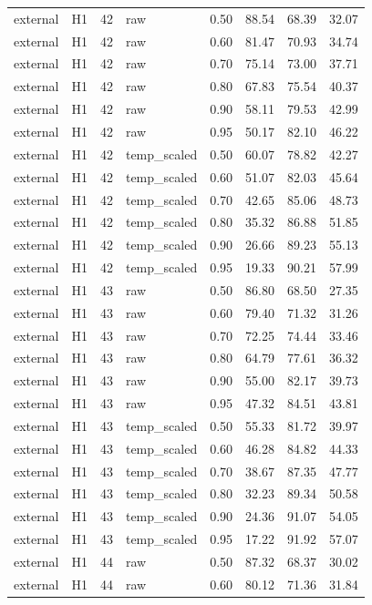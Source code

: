 \begin{tabular}{llrlrrrr}
external & H1 & 42 & raw & 0.50 & 88.54 & 68.39 & 32.07 \\
external & H1 & 42 & raw & 0.60 & 81.47 & 70.93 & 34.74 \\
external & H1 & 42 & raw & 0.70 & 75.14 & 73.00 & 37.71 \\
external & H1 & 42 & raw & 0.80 & 67.83 & 75.54 & 40.37 \\
external & H1 & 42 & raw & 0.90 & 58.11 & 79.53 & 42.99 \\
external & H1 & 42 & raw & 0.95 & 50.17 & 82.10 & 46.22 \\
external & H1 & 42 & temp\_scaled & 0.50 & 60.07 & 78.82 & 42.27 \\
external & H1 & 42 & temp\_scaled & 0.60 & 51.07 & 82.03 & 45.64 \\
external & H1 & 42 & temp\_scaled & 0.70 & 42.65 & 85.06 & 48.73 \\
external & H1 & 42 & temp\_scaled & 0.80 & 35.32 & 86.88 & 51.85 \\
external & H1 & 42 & temp\_scaled & 0.90 & 26.66 & 89.23 & 55.13 \\
external & H1 & 42 & temp\_scaled & 0.95 & 19.33 & 90.21 & 57.99 \\
external & H1 & 43 & raw & 0.50 & 86.80 & 68.50 & 27.35 \\
external & H1 & 43 & raw & 0.60 & 79.40 & 71.32 & 31.26 \\
external & H1 & 43 & raw & 0.70 & 72.25 & 74.44 & 33.46 \\
external & H1 & 43 & raw & 0.80 & 64.79 & 77.61 & 36.32 \\
external & H1 & 43 & raw & 0.90 & 55.00 & 82.17 & 39.73 \\
external & H1 & 43 & raw & 0.95 & 47.32 & 84.51 & 43.81 \\
external & H1 & 43 & temp\_scaled & 0.50 & 55.33 & 81.72 & 39.97 \\
external & H1 & 43 & temp\_scaled & 0.60 & 46.28 & 84.82 & 44.33 \\
external & H1 & 43 & temp\_scaled & 0.70 & 38.67 & 87.35 & 47.77 \\
external & H1 & 43 & temp\_scaled & 0.80 & 32.23 & 89.34 & 50.58 \\
external & H1 & 43 & temp\_scaled & 0.90 & 24.36 & 91.07 & 54.05 \\
external & H1 & 43 & temp\_scaled & 0.95 & 17.22 & 91.92 & 57.07 \\
external & H1 & 44 & raw & 0.50 & 87.32 & 68.37 & 30.02 \\
external & H1 & 44 & raw & 0.60 & 80.12 & 71.36 & 31.84 \\

\end{tabular}

